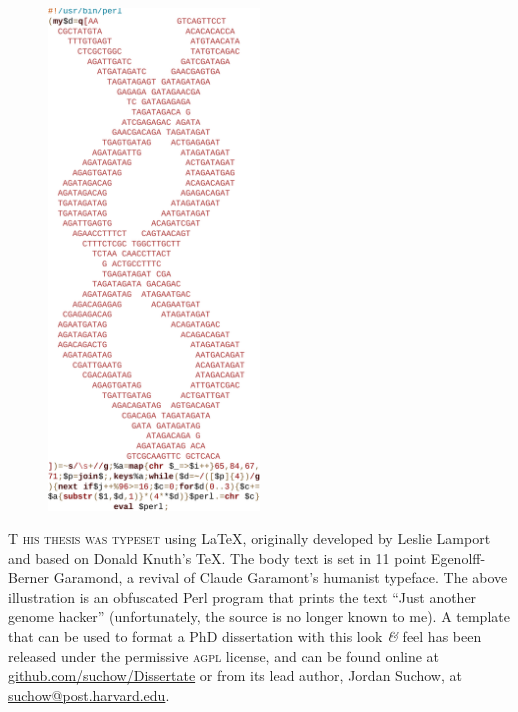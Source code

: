 \newpage

\begin{figure}[h!]
  \centering
  \includegraphics[width=0.5\textwidth]{endmatter/jagh}
\end{figure}

\newpage

\begin{center}
\parbox{200pt}{\lettrine[lines=3,slope=-2pt,nindent=-4pt]{\textcolor{SchoolColor}{T}}{ his thesis was typeset} using \LaTeX, originally developed by Leslie Lamport and based on Donald Knuth's \TeX. The body text is set in 11 point Egenolff-Berner Garamond, a revival of Claude Garamont's humanist typeface. The above illustration is an obfuscated Perl program that prints the text ``Just another genome hacker'' (unfortunately, the source is no longer known to me). A template that can be used to format a PhD dissertation with this look \textit{\&} feel has been released under the permissive \textsc{agpl} license, and can be found online at \href{https://github.com/suchow/Dissertate}{github.com/suchow/Dissertate} or from its lead author, Jordan Suchow, at \href{mailto:suchow@post.harvard.edu}{suchow@post.harvard.edu}.}
\end{center}
